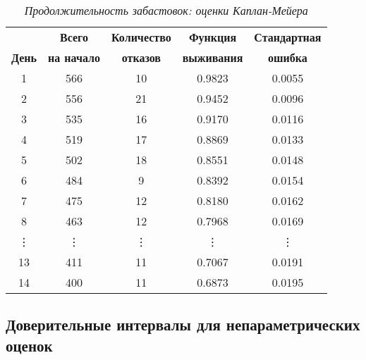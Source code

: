     \begin{table}[!htbp]\caption{\textit{Продолжительность забастовок: оценки Каплан-Мейера}}\label{tab:17.3}
    \begin{center}
\begin{tabular}{ccccc}
    \hline \hline
                &\textbf{Всего}        &\textbf{Количество} &\textbf{Функция}    &\textbf{Стандартная}\\
\textbf{День}   &\textbf{на начало}    &\textbf{отказов}    &\textbf{выживания}  &\textbf{ошибка}\\
    \hline
1               &566                        &10                 &0.9823                     &0.0055\\
2               &556                        &21                 &0.9452                     &0.0096\\
3               &535                        &16                 &0.9170                     &0.0116\\
4               &519                        &17                 &0.8869                     &0.0133\\
5               &502                        &18                 &0.8551                     &0.0148\\
6               &484                        &9                  &0.8392                     &0.0154\\
7               &475                        &12                 &0.8180                     &0.0162\\
8               &463                        &12                 &0.7968                     &0.0169\\
\vdots          &\vdots                     &\vdots             &\vdots                     &\vdots\\
13              &411                        &11                 &0.7067                     &0.0191\\
14              &400                        &11                 &0.6873                     &0.0195\\
    \hline \hline
\end{tabular}
    \end{center}
    \end{table}


\subsection{Доверительные интервалы для непараметрических оценок}\label{sec:17.5.2}

